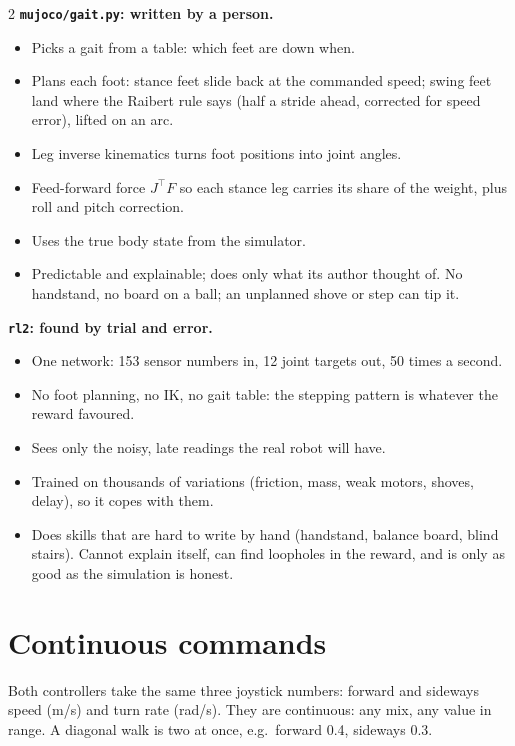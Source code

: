 \documentclass[10pt,letterpaper]{article}
\begin{document}
\begin{multicols}{2}
\textbf{\texttt{mujoco/gait.py}: written by a person.}
\begin{itemize}
\item Picks a gait from a table: which feet are down when.
\item Plans each foot: stance feet slide back at the commanded speed; swing feet land where the Raibert rule says (half a stride
ahead, corrected for speed error), lifted on an arc.
\item Leg inverse kinematics turns foot positions into joint angles.
\item Feed-forward force $J^\top F$ so each stance leg carries its share of the weight, plus roll and pitch correction.
\item Uses the true body state from the simulator.
\item Predictable and explainable; does only what its author thought of. No handstand, no board on a ball; an unplanned shove or step can tip it.
\end{itemize}
\columnbreak
\textbf{\texttt{rl2}: found by trial and error.}
\begin{itemize}
\item One network: 153 sensor numbers in, 12 joint targets out, 50 times a second.
\item No foot planning, no IK, no gait table: the stepping pattern is whatever the reward favoured.
\item Sees only the noisy, late readings the real robot will have.
\item Trained on thousands of variations (friction, mass, weak motors, shoves, delay), so it copes with them.
\item Does skills that are hard to write by hand (handstand, balance board, blind stairs). Cannot explain itself, can find loopholes in the reward, and is only as good as the simulation is honest.
\end{itemize}
\end{multicols}

\section{Continuous commands}

Both controllers take the same three joystick numbers: forward and sideways speed (m/s) and turn rate (rad/s). They are continuous:
any mix, any value in range. A diagonal walk is two at once, e.g.\ forward 0.4, sideways 0.3.
\end{document}
